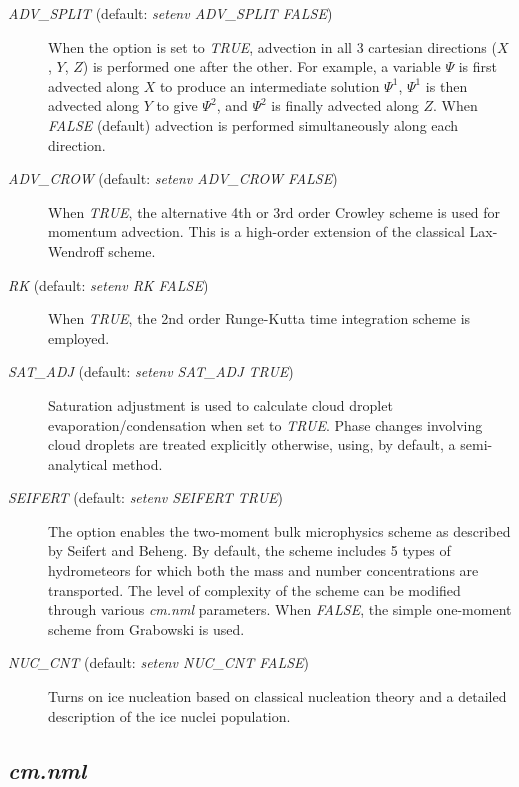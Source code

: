 \documentclass[12pt,A4,french]{article}
\begin{document}
\begin{description}
\item[{\it ADV\_SPLIT} (default: {\it setenv ADV\_SPLIT FALSE})]

When the option is set to {\it TRUE}, advection in all 3 cartesian directions ($X$, $Y$, $Z$) is performed one after the other. For example, a variable $\Psi$ is first advected along $X$ to produce an intermediate solution $\Psi^1$, $\Psi^1$ is then advected along $Y$ to give $\Psi^2$, and $\Psi^2$ is finally advected along $Z$. When {\it FALSE} (default) advection is performed simultaneously along each direction.

\item[{\it ADV\_CROW} (default: {\it setenv ADV\_CROW FALSE})]

When {\it TRUE}, the alternative 4th or 3rd order Crowley scheme is used for momentum advection. This is a high-order extension of the classical Lax-Wendroff scheme.

\item[{\it RK} (default: {\it setenv RK FALSE})]

When {\it TRUE}, the 2nd order Runge-Kutta time integration scheme is employed. 

\item[{\it SAT\_ADJ} (default: {\it setenv SAT\_ADJ TRUE})]

Saturation adjustment is used to calculate cloud droplet evaporation/condensation when set to {\it TRUE}. Phase changes involving cloud droplets are treated explicitly otherwise, using, by default, a semi-analytical method.

\item[{\it SEIFERT} (default: {\it setenv SEIFERT TRUE})]

The option enables the two-moment bulk microphysics scheme as described by Seifert and Beheng. By default, the scheme includes 5 types of hydrometeors for which both the mass and number concentrations are transported. The level of complexity of the scheme can be modified through various {\it cm.nml} parameters. When {\it FALSE}, the simple one-moment scheme from Grabowski is used.

\item[{\it NUC\_CNT} (default: {\it setenv NUC\_CNT FALSE})]

Turns on ice nucleation based on classical nucleation theory and a detailed description of the ice nuclei population.

\end{description}

\subsection{{\it cm.nml}}
\end{document}
